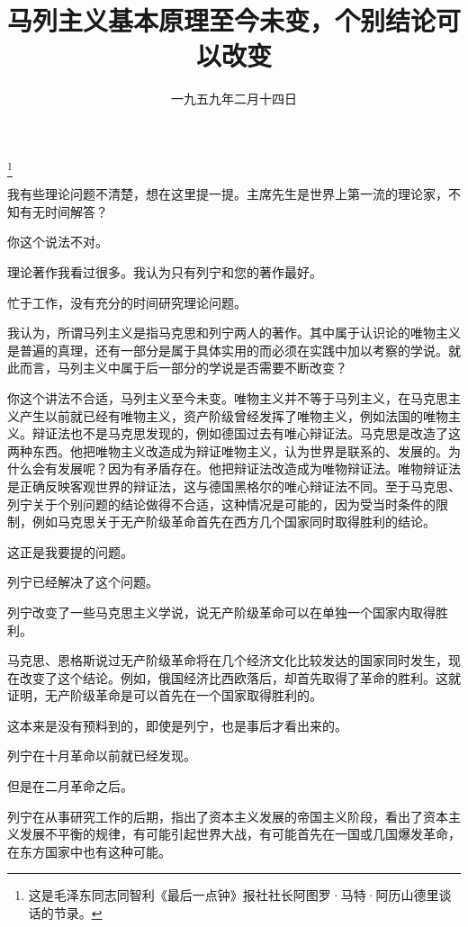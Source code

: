 
\title{马列主义基本原理至今未变，个别结论可以改变}
\date{一九五九年二月十四日}
\thanks{这是毛泽东同志同智利《最后一点钟》报社社长阿图罗·马特·阿历山德里谈话的节录。}
\maketitle


我有些理论问题不清楚，想在这里提一提。主席先生是世界上第一流的理论家，不知有无时间解答？

你这个说法不对。

理论著作我看过很多。我认为只有列宁和您的著作最好。

忙于工作，没有充分的时间研究理论问题。

我认为，所谓马列主义是指马克思和列宁两人的著作。其中属于认识论的唯物主义是普遍的真理，还有一部分是属于具体实用的而必须在实践中加以考察的学说。就此而言，马列主义中属于后一部分的学说是否需要不断改变？

你这个讲法不合适，马列主义至今未变。唯物主义并不等于马列主义，在马克思主义产生以前就已经有唯物主义，资产阶级曾经发挥了唯物主义，例如法国的唯物主义。辩证法也不是马克思发现的，例如德国过去有唯心辩证法。马克思是改造了这两种东西。他把唯物主义改造成为辩证唯物主义，认为世界是联系的、发展的。为什么会有发展呢？因为有矛盾存在。他把辩证法改造成为唯物辩证法。唯物辩证法是正确反映客观世界的辩证法，这与德国黑格尔的唯心辩证法不同。至于马克思、列宁关于个别问题的结论做得不合适，这种情况是可能的，因为受当时条件的限制，例如马克思关于无产阶级革命首先在西方几个国家同时取得胜利的结论。

这正是我要提的问题。

列宁已经解决了这个问题。

列宁改变了一些马克思主义学说，说无产阶级革命可以在单独一个国家内取得胜利。

马克思、恩格斯说过无产阶级革命将在几个经济文化比较发达的国家同时发生，现在改变了这个结论。例如，俄国经济比西欧落后，却首先取得了革命的胜利。这就证明，无产阶级革命是可以首先在一个国家取得胜利的。

这本来是没有预料到的，即使是列宁，也是事后才看出来的。

列宁在十月革命以前就已经发现。

但是在二月革命之后。

列宁在从事研究工作的后期，指出了资本主义发展的帝国主义阶段，看出了资本主义发展不平衡的规律，有可能引起世界大战，有可能首先在一国或几国爆发革命，在东方国家中也有这种可能。

